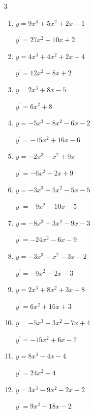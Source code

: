 \begin{multicols}{3}
\begin{enumerate}
        $\displaystyle y^{\prime}=6x^{2}+14x+4$

  \item $y=9x^{3}+5x^{2}+2x-1$

        $\displaystyle y^{\prime}=27x^{2}+10x+2$

  \item $y=4x^{3}+4x^{2}+2x+4$

        $\displaystyle y^{\prime}=12x^{2}+8x+2$

  \item $y=2x^{3}+8x-5$

        $\displaystyle y^{\prime}=6x^{2}+8$

  \item $y=-5x^{3}+8x^{2}-6x-2$

        $\displaystyle y^{\prime}=-15x^{2}+16x-6$

  \item $y=-2x^{3}+x^{2}+9x$

        $\displaystyle y^{\prime}=-6x^{2}+2x+9$

\columnbreak %

\resetques

  \item $y=-3x^{3}-5x^{2}-5x-5$

        $\displaystyle y^{\prime}=-9x^{2}-10x-5$

  \item $y=-8x^{3}-3x^{2}-9x-3$

        $\displaystyle y^{\prime}=-24x^{2}-6x-9$

  \item $y=-3x^{3}-x^{2}-3x-2$

        $\displaystyle y^{\prime}=-9x^{2}-2x-3$

  \item $y=2x^{3}+8x^{2}+3x-8$

        $\displaystyle y^{\prime}=6x^{2}+16x+3$

  \item $y=-5x^{3}+3x^{2}-7x+4$

        $\displaystyle y^{\prime}=-15x^{2}+6x-7$

  \item $y=8x^{3}-4x-4$

        $\displaystyle y^{\prime}=24x^{2}-4$

  \item $y=3x^{3}-9x^{2}-2x-2$

        $\displaystyle y^{\prime}=9x^{2}-18x-2$


\end{enumerate}
\end{multicols}
